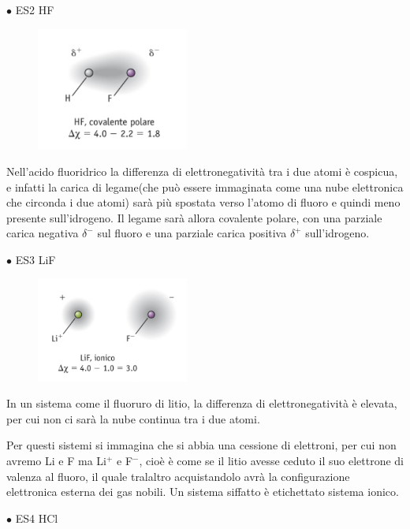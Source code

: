 \vspace{0.2cm}$\bullet$ ES2 HF

\begin{figure}[htp]
    \centering
    \includegraphics[width=5cm]{immagini/HF.png}
\end{figure}
Nell'acido fluoridrico la differenza di elettronegatività tra i due atomi è cospicua, e infatti la carica di legame(che può essere immaginata come una nube elettronica che circonda i due atomi) sarà più spostata verso l'atomo di fluoro e quindi meno presente sull'idrogeno. Il legame sarà allora covalente polare, con una parziale carica negativa $\delta^-$ sul fluoro e una parziale carica positiva $\delta^+$ sull'idrogeno. 

\vspace{0.2cm}$\bullet$ ES3 LiF

\begin{figure}[htp]
    \centering
    \includegraphics[width=5cm]{immagini/LiF.png}
\end{figure}

\vspace{-0.4cm}In un sistema come il fluoruro di litio, la differenza di elettronegatività è elevata, per cui non ci sarà la nube continua tra i due atomi.

Per questi sistemi si immagina che si abbia una cessione di elettroni, per cui non avremo Li e F ma Li$^+$ e F$^-$, cioè è come se il litio avesse ceduto il suo elettrone di valenza al fluoro, il quale tralaltro acquistandolo avrà la configurazione elettronica esterna dei gas nobili.
Un sistema siffatto è etichettato sistema ionico.

\vspace{0.2cm}$\bullet$ ES4 HCl

